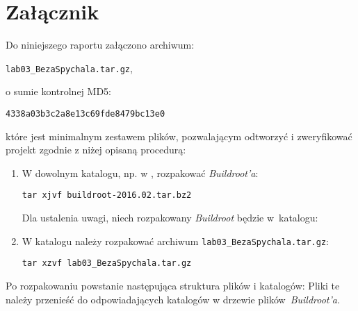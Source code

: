 \documentclass{article}
\newcommand{\labnumber}{3}
\begin{document}

\section{Załącznik}

Do niniejszego raportu załączono archiwum:
\begin{center}
\texttt{lab0\labnumber\_BezaSpychala.tar.gz},
\end{center}
o sumie kontrolnej MD5:
\begin{center}
\texttt{4338a03b3c2a8e13c69fde8479bc13e0}
\end{center}
które jest minimalnym zestawem plików, pozwalającym odtworzyć i zweryfikować projekt zgodnie z niżej opisaną procedurą:
\begin{enumerate}
\item W dowolnym katalogu, np. w , rozpakować \emph{Buildroot'a}:
\begin{center}
\texttt{tar xjvf buildroot-2016.02.tar.bz2}
\end{center}

Dla ustalenia uwagi, niech rozpakowany \emph{Buildroot} będzie w~katalogu:
\begin{center}
\end{center}

\item W katalogu  należy rozpakować archiwum \texttt{lab0\labnumber\_BezaSpychala.tar.gz}:
\begin{center}
\texttt{tar xzvf lab0\labnumber\_BezaSpychala.tar.gz}
\end{center}
\end{enumerate}

Po rozpakowaniu powstanie następująca struktura plików i katalogów:
Pliki te należy przenieść do odpowiadających katalogów w drzewie plików~\emph{Buildroot'a}.




\end{document}
